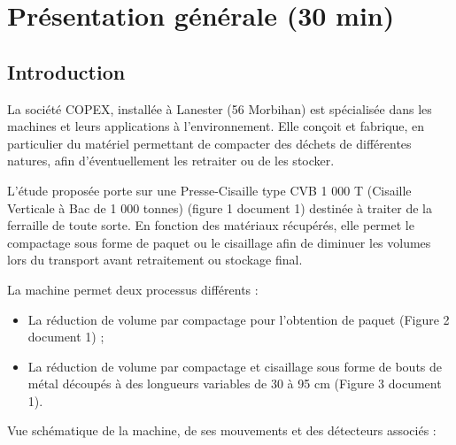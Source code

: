 

\section{Présentation générale (30 min)}

\subsection{Introduction}

La société COPEX, installée à Lanester (56 Morbihan) est spécialisée dans les machines et leurs applications à l'environnement. Elle conçoit et fabrique, en particulier du matériel permettant de compacter des déchets de différentes natures, afin d'éventuellement les retraiter ou de les stocker.

L'étude proposée porte sur une Presse-Cisaille type CVB 1 000 T (Cisaille Verticale à Bac de 1 000 tonnes) (figure 1 document 1) destinée à traiter de la ferraille de toute sorte. En fonction des matériaux récupérés, elle permet le compactage sous forme de paquet ou le cisaillage afin de diminuer les volumes lors du transport avant retraitement ou stockage final.

La machine permet deux processus différents :
\begin{itemize}
 \item La réduction de volume par compactage pour l'obtention de paquet (Figure 2 document 1) ;
 \item La réduction de volume par compactage et cisaillage sous forme de bouts de métal découpés à des longueurs variables de 30 à 95 cm (Figure 3 document 1).
\end{itemize}

Vue schématique de la machine, de ses mouvements et des détecteurs associés :


